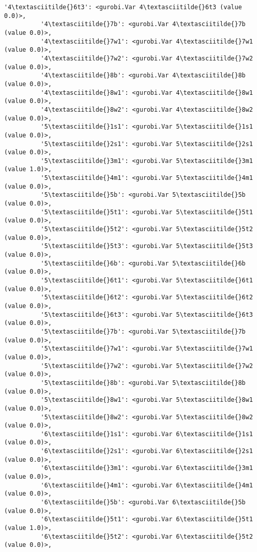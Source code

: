 \documentclass[11pt]{article}
\begin{document}
\begin{Verbatim}[commandchars=\\\{\}]
          '4\textasciitilde{}6t3': <gurobi.Var 4\textasciitilde{}6t3 (value 0.0)>,
          '4\textasciitilde{}7b': <gurobi.Var 4\textasciitilde{}7b (value 0.0)>,
          '4\textasciitilde{}7w1': <gurobi.Var 4\textasciitilde{}7w1 (value 0.0)>,
          '4\textasciitilde{}7w2': <gurobi.Var 4\textasciitilde{}7w2 (value 0.0)>,
          '4\textasciitilde{}8b': <gurobi.Var 4\textasciitilde{}8b (value 0.0)>,
          '4\textasciitilde{}8w1': <gurobi.Var 4\textasciitilde{}8w1 (value 0.0)>,
          '4\textasciitilde{}8w2': <gurobi.Var 4\textasciitilde{}8w2 (value 0.0)>,
          '5\textasciitilde{}1s1': <gurobi.Var 5\textasciitilde{}1s1 (value 0.0)>,
          '5\textasciitilde{}2s1': <gurobi.Var 5\textasciitilde{}2s1 (value 0.0)>,
          '5\textasciitilde{}3m1': <gurobi.Var 5\textasciitilde{}3m1 (value 1.0)>,
          '5\textasciitilde{}4m1': <gurobi.Var 5\textasciitilde{}4m1 (value 0.0)>,
          '5\textasciitilde{}5b': <gurobi.Var 5\textasciitilde{}5b (value 0.0)>,
          '5\textasciitilde{}5t1': <gurobi.Var 5\textasciitilde{}5t1 (value 0.0)>,
          '5\textasciitilde{}5t2': <gurobi.Var 5\textasciitilde{}5t2 (value 0.0)>,
          '5\textasciitilde{}5t3': <gurobi.Var 5\textasciitilde{}5t3 (value 0.0)>,
          '5\textasciitilde{}6b': <gurobi.Var 5\textasciitilde{}6b (value 0.0)>,
          '5\textasciitilde{}6t1': <gurobi.Var 5\textasciitilde{}6t1 (value 0.0)>,
          '5\textasciitilde{}6t2': <gurobi.Var 5\textasciitilde{}6t2 (value 0.0)>,
          '5\textasciitilde{}6t3': <gurobi.Var 5\textasciitilde{}6t3 (value 0.0)>,
          '5\textasciitilde{}7b': <gurobi.Var 5\textasciitilde{}7b (value 0.0)>,
          '5\textasciitilde{}7w1': <gurobi.Var 5\textasciitilde{}7w1 (value 0.0)>,
          '5\textasciitilde{}7w2': <gurobi.Var 5\textasciitilde{}7w2 (value 0.0)>,
          '5\textasciitilde{}8b': <gurobi.Var 5\textasciitilde{}8b (value 0.0)>,
          '5\textasciitilde{}8w1': <gurobi.Var 5\textasciitilde{}8w1 (value 0.0)>,
          '5\textasciitilde{}8w2': <gurobi.Var 5\textasciitilde{}8w2 (value 0.0)>,
          '6\textasciitilde{}1s1': <gurobi.Var 6\textasciitilde{}1s1 (value 0.0)>,
          '6\textasciitilde{}2s1': <gurobi.Var 6\textasciitilde{}2s1 (value 0.0)>,
          '6\textasciitilde{}3m1': <gurobi.Var 6\textasciitilde{}3m1 (value 0.0)>,
          '6\textasciitilde{}4m1': <gurobi.Var 6\textasciitilde{}4m1 (value 0.0)>,
          '6\textasciitilde{}5b': <gurobi.Var 6\textasciitilde{}5b (value 0.0)>,
          '6\textasciitilde{}5t1': <gurobi.Var 6\textasciitilde{}5t1 (value 1.0)>,
          '6\textasciitilde{}5t2': <gurobi.Var 6\textasciitilde{}5t2 (value 0.0)>,

\end{Verbatim}
\end{document}

